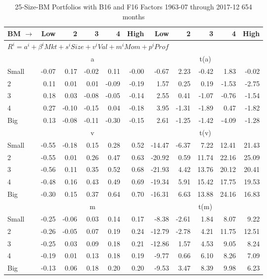 
\begin{table}[!ht]
\footnotesize
\centering
\caption{25-Size-BM Portfolios with B16 and F16 Factors 1963-07 through 2017-12
654 months}
\begin{tabular}{lrrrrrrrrrr}
  \toprule
    
    BM $\rightarrow$ & Low & 2 & 3 & 4 & High & Low & 2 & 3 & 4 & High  \\ 
  \midrule
  \multicolumn{11}{l}{$R^i=a^i+\beta^iMkt+s^iSize+v^iVal+m^iMom+p^iProf$}  \\
  
     & \multicolumn{5}{c}{a} & \multicolumn{5}{c}{t(a)}   \\
     \cmidrule(r){2-6} \cmidrule(r){7-11} 
    Small  & -0.07  & 0.17  & -0.02  & 0.11  & -0.00  & -0.67  & 2.23  & -0.42  & 1.83  & -0.02   \\
    2  & 0.11  & 0.01  & 0.01  & -0.09  & -0.19  & 1.57  & 0.25  & 0.19  & -1.53  & -2.75   \\
    3  & 0.18  & 0.03  & -0.08  & -0.05  & -0.14  & 2.55  & 0.41  & -1.07  & -0.76  & -1.54   \\
    4  & 0.27  & -0.10  & -0.15  & 0.04  & -0.18  & 3.95  & -1.31  & -1.89  & 0.47  & -1.82   \\
    Big  & 0.13  & -0.08  & -0.11  & -0.30  & -0.15  & 2.61  & -1.25  & -1.42  & -4.09  & -1.28   \\
    
  
     & \multicolumn{5}{c}{v} & \multicolumn{5}{c}{t(v)}   \\
     \cmidrule(r){2-6} \cmidrule(r){7-11} 
    Small  & -0.55  & -0.18  & 0.15  & 0.28  & 0.52  & -14.47  & -6.37  & 7.22  & 12.41  & 21.43   \\
    2  & -0.55  & 0.01  & 0.26  & 0.47  & 0.63  & -20.92  & 0.59  & 11.74  & 22.16  & 25.09   \\
    3  & -0.56  & 0.11  & 0.35  & 0.52  & 0.68  & -21.93  & 4.42  & 13.76  & 20.12  & 20.41   \\
    4  & -0.48  & 0.16  & 0.43  & 0.49  & 0.69  & -19.34  & 5.91  & 15.42  & 17.75  & 19.53   \\
    Big  & -0.30  & 0.15  & 0.37  & 0.64  & 0.70  & -16.31  & 6.63  & 13.88  & 24.16  & 16.83   \\
    
  
     & \multicolumn{5}{c}{m} & \multicolumn{5}{c}{t(m)}   \\
     \cmidrule(r){2-6} \cmidrule(r){7-11} 
    Small  & -0.25  & -0.06  & 0.03  & 0.14  & 0.17  & -8.38  & -2.61  & 1.84  & 8.07  & 9.22   \\
    2  & -0.26  & -0.05  & 0.07  & 0.19  & 0.24  & -12.79  & -2.78  & 4.21  & 11.75  & 12.51   \\
    3  & -0.25  & 0.03  & 0.09  & 0.18  & 0.21  & -12.86  & 1.57  & 4.53  & 9.05  & 8.24   \\
    4  & -0.19  & 0.01  & 0.13  & 0.18  & 0.19  & -9.77  & 0.66  & 6.10  & 8.26  & 7.09   \\
    Big  & -0.13  & 0.06  & 0.18  & 0.20  & 0.20  & -9.53  & 3.47  & 8.39  & 9.98  & 6.23   \\
    

\end{tabular}
\end{table}
